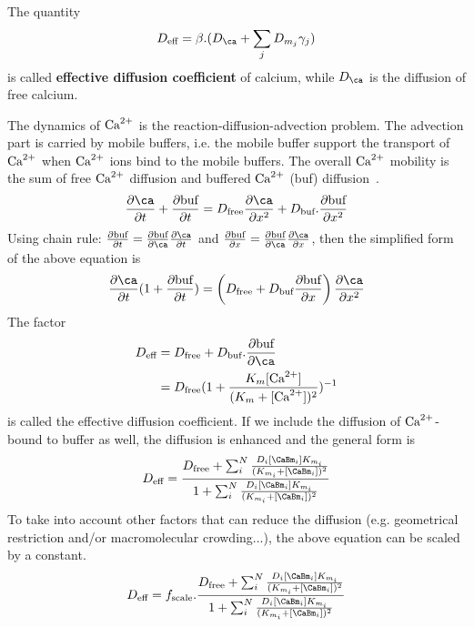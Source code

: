 The quantity
\begin{equation}
  \label{eq:1098}
  D_\text{eff} = \beta.(D_\ca+\sum_jD_{m_j}\gamma_j)
\end{equation}
is called {\bf effective diffusion coefficient} of calcium, while
$D_\ca$ is the diffusion of free calcium.




The dynamics of ${\text{Ca}^{2+}}$ is the reaction-diffusion-advection problem. The
advection part is carried by mobile buffers, i.e. the mobile buffer
support the transport of ${\text{Ca}^{2+}}$ when ${\text{Ca}^{2+}}$ ions bind to the mobile
buffers. The overall ${\text{Ca}^{2+}}$ mobility is the sum of free ${\text{Ca}^{2+}}$ diffusion
and buffered ${\text{Ca}^{2+}}$ (buf) diffusion~\citep{wagner1994erb}.
\begin{equation}
  \label{eq:1101}
  \frac{\partial \ca}{\partial t} + \frac{\partial \text{buf}}{\partial
      t} = 
D_\text{free} \frac{\partial \ca}{\partial x^2} + D_\text{buf}.\frac{\partial
  \text{buf}}{\partial x^2}
\end{equation}
Using chain rule: $\frac{\partial \text{buf}}{\partial
  t} =\frac{\partial \text{buf}}{\partial
  \ca}\frac{\partial \ca}{\partial
  t}  $ and $\frac{\partial
  \text{buf}}{\partial x}=\frac{\partial
  \text{buf}}{\partial \ca}\frac{\partial
  \ca}{\partial x}$, then the simplified form of the above equation is
\begin{equation}
  \label{eq:1102}
  \frac{\partial \ca}{\partial t}(1+\frac{\partial
    \text{buf}}{\partial t}) =
  \left(D_\text{free}+D_\text{buf}\frac{\partial\text{buf}}{\partial x}\right)\frac{\partial \ca}{\partial x^2}
\end{equation}
The factor
\begin{equation}
  \label{eq:1100}
  \begin{split}
    D_\text{eff} &= D_\text{free} + D_\text{buf}.\frac{\partial
      \text{buf}}{\partial\ca} \\
    &= D_\text{free} (1+\frac{K_m[\Ca]}{(K_m+[\Ca])^2})^{-1}
  \end{split}
\end{equation}
is called the effective diffusion coefficient. If we include the
diffusion of ${\text{Ca}^{2+}}$-bound to buffer as well, the diffusion is enhanced
and the general form is
\begin{equation}
  \label{eq:1103}
  D_\text{eff} = \frac{D_\text{free}+\sum^N_i\frac{D_i[\CaBm_i]K_{m_i}}{(K_{m_i}+[\CaBm_i])^2}}{1+\sum^N_i\frac{D_i[\CaBm_i]K_{m_i}}{(K_{m_i}+[\CaBm_i])^2}}
\end{equation}
To take into account other factors that can reduce the diffusion
(e.g. geometrical restriction and/or macromolecular crowding...), the
above equation can be scaled by a constant. 
\begin{equation}
  \label{eq:1104}
  D_\text{eff} = f_\text{scale}.\frac{D_\text{free}+\sum^N_i\frac{D_i[\CaBm_i]K_{m_i}}{(K_{m_i}+[\CaBm_i])^2}}{1+\sum^N_i\frac{D_i[\CaBm_i]K_{m_i}}{(K_{m_i}+[\CaBm_i])^2}}
\end{equation}

